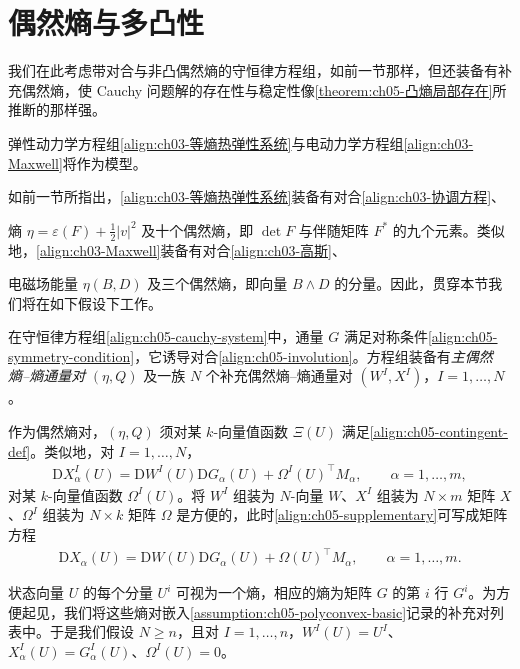 \documentclass[../../main.tex]{subfiles}
\begin{document}
\section{偶然熵与多凸性}\label{section:ch05-偶然熵与多凸性}

我们在此考虑带对合与非凸偶然熵的守恒律方程组，如前一节那样，但还装备有补充偶然熵，使 Cauchy 问题解的存在性与稳定性像\cref{theorem:ch05-凸熵局部存在}所推断的那样强。

弹性动力学方程组\eqref{align:ch03-等熵热弹性系统}与电动力学方程组\eqref{align:ch03-Maxwell}将作为模型。

如前一节所指出，\eqref{align:ch03-等熵热弹性系统}装备有对合\eqref{align:ch03-协调方程}、

熵 $\eta=\varepsilon(F)+\frac{1}{2}|v|^{2}$ 及十个偶然熵，即 $\det F$ 与伴随矩阵 $F^{*}$ 的九个元素。类似地，\eqref{align:ch03-Maxwell}装备有对合\eqref{align:ch03-高斯}、

电磁场能量 $\eta(B,D)$ 及三个偶然熵，即向量 $B\wedge D$ 的分量。因此，贯穿本节我们将在如下假设下工作。

\begin{assumption}[多凸性基本假设]\label{assumption:ch05-polyconvex-basic}
在守恒律方程组\eqref{align:ch05-cauchy-system}中，通量 $G$ 满足对称条件\eqref{align:ch05-symmetry-condition}，它诱导对合\eqref{align:ch05-involution}。方程组装备有\emph{主偶然熵--熵通量对} $(\eta,Q)$ 及一族 $N$ 个补充偶然熵--熵通量对 $(W^{I},X^{I})$，$I=1,\ldots,N$。
\end{assumption}

作为偶然熵对，$(\eta,Q)$ 须对某 $k$-向量值函数 $\Xi(U)$ 满足\eqref{align:ch05-contingent-def}。类似地，对 $I=1,\ldots,N$，
\begin{align}
\mathrm{D}X_{\alpha}^{I}(U)=\mathrm{D}W^{I}(U)\mathrm{D}G_{\alpha}(U)+\Omega^{I}(U)^{\top}M_{\alpha},\qquad\alpha=1,\ldots,m,\label{align:ch05-supplementary}
\end{align}
对某 $k$-向量值函数 $\Omega^{I}(U)$。将 $W^{I}$ 组装为 $N$-向量 $W$、$X^{I}$ 组装为 $N\times m$ 矩阵 $X$、$\Omega^{I}$ 组装为 $N\times k$ 矩阵 $\Omega$ 是方便的，此时\eqref{align:ch05-supplementary}可写成矩阵方程
\begin{align}
\mathrm{D}X_{\alpha}(U)=\mathrm{D}W(U)\mathrm{D}G_{\alpha}(U)+\Omega(U)^{\top}M_{\alpha},\qquad\alpha=1,\ldots,m.\label{align:ch05-supplementary-matrix}
\end{align}

状态向量 $U$ 的每个分量 $U^{i}$ 可视为一个熵，相应的熵为矩阵 $G$ 的第 $i$ 行 $G^{i}$。为方便起见，我们将这些熵对嵌入\cref{assumption:ch05-polyconvex-basic}记录的补充对列表中。于是我们假设 $N\geqslant n$，且对 $I=1,\ldots,n$，$W^{I}(U)=U^{I}$、$X_{\alpha}^{I}(U)=G_{\alpha}^{I}(U)$、$\Omega^{I}(U)=0$。
\end{document}
